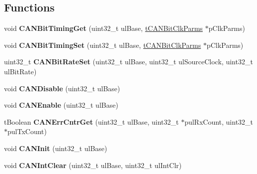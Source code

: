 \subsection*{Functions}
\begin{DoxyCompactItemize}
\item 
void {\bfseries C\+A\+N\+Bit\+Timing\+Get} (uint32\+\_\+t ul\+Base, \hyperlink{structtCANBitClkParms}{t\+C\+A\+N\+Bit\+Clk\+Parms} $\ast$p\+Clk\+Parms)\hypertarget{group__can__api_ga371176a5650920741fc0993879983d5e}{}\label{group__can__api_ga371176a5650920741fc0993879983d5e}

\item 
void {\bfseries C\+A\+N\+Bit\+Timing\+Set} (uint32\+\_\+t ul\+Base, \hyperlink{structtCANBitClkParms}{t\+C\+A\+N\+Bit\+Clk\+Parms} $\ast$p\+Clk\+Parms)\hypertarget{group__can__api_ga4e4b9e0e2f20d4c7749eaca1321da1a0}{}\label{group__can__api_ga4e4b9e0e2f20d4c7749eaca1321da1a0}

\item 
uint32\+\_\+t {\bfseries C\+A\+N\+Bit\+Rate\+Set} (uint32\+\_\+t ul\+Base, uint32\+\_\+t ul\+Source\+Clock, uint32\+\_\+t ul\+Bit\+Rate)\hypertarget{group__can__api_gabbbb2deb01808516a657c9c3442d2214}{}\label{group__can__api_gabbbb2deb01808516a657c9c3442d2214}

\item 
void {\bfseries C\+A\+N\+Disable} (uint32\+\_\+t ul\+Base)\hypertarget{group__can__api_ga9fd01ed5e5b6511455e457f85e07d039}{}\label{group__can__api_ga9fd01ed5e5b6511455e457f85e07d039}

\item 
void {\bfseries C\+A\+N\+Enable} (uint32\+\_\+t ul\+Base)\hypertarget{group__can__api_gac924425e382812baabdb5fd987ac0434}{}\label{group__can__api_gac924425e382812baabdb5fd987ac0434}

\item 
t\+Boolean {\bfseries C\+A\+N\+Err\+Cntr\+Get} (uint32\+\_\+t ul\+Base, uint32\+\_\+t $\ast$pul\+Rx\+Count, uint32\+\_\+t $\ast$pul\+Tx\+Count)\hypertarget{group__can__api_ga29ff4f182bc29434059d1ad95df44626}{}\label{group__can__api_ga29ff4f182bc29434059d1ad95df44626}

\item 
void {\bfseries C\+A\+N\+Init} (uint32\+\_\+t ul\+Base)\hypertarget{group__can__api_ga5a940bd5f7b4dc4940bf14d0c511dc3a}{}\label{group__can__api_ga5a940bd5f7b4dc4940bf14d0c511dc3a}

\item 
void {\bfseries C\+A\+N\+Int\+Clear} (uint32\+\_\+t ul\+Base, uint32\+\_\+t ul\+Int\+Clr)\hypertarget{group__can__api_ga9a124df323d35da52ce6cf20b6627839}{}\label{group__can__api_ga9a124df323d35da52ce6cf20b6627839}


\end{DoxyCompactItemize}
